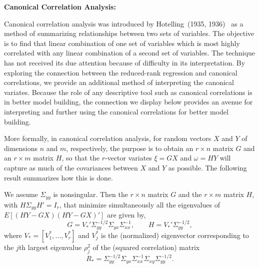 \noindent \textbf{Canonical Correlation Analysis:} \twomedskip


\noindent Canonical correlation analysis was introduced by Hotelling~(1935, 1936)~\cite{hotelling35,hotelling36} as a method of summarizing relationships between two sets of variables. The objective is to find that linear combination of one set of variables which is most highly correlated with any linear combination of a second set of variables. The technique has not received its due attention because of difficulty in its interpretation. By exploring the connection between the reduced-rank regression and canonical correlations, we provide an additional method of interpreting the canonical variates. Because the role of any descriptive tool such as canonical correlations is in better model building, the connection we display below provides an avenue for interpreting and further using the canonical correlations for better model building.


More formally, in canonical correlation analysis, for random vectors $X$ and $Y$ of dimensions $n$ and $m$, respectively, the purpose is to obtain an $r \times n$ matrix $G$ and an $r \times m$ matrix $H$, so that the $r$-vector variates $\xi= GX$ and $\omega= HY$ will capture as much of the covariances between $X$ and $Y$ as possible. The following result summarizes how this is done.


\begin{result} \label{res:4} 
We assume $\Sigma_{yy}$ is nonsingular. Then the $r \times n$ matrix $G$ and the $r \times m$ matrix $H$, with $H \Sigma_{yy}H'= I_r$, that minimize simultaneously all the eigenvalues of $E[(HY-GX)(HY-GX)']$ are given by,
	\begin{equation}
	G= V_*'  \Sigma_{yy}^{-1/2} \Sigma_{yx} \Sigma_{xx}^{-1}, \qquad H= V_*'  \Sigma_{yy}^{-1/2},
	\end{equation}
where $V_*= [V_1^*, \ldots, V_r^*]$ and $V_j^*$ is the (normalized) eigenvector corresponding to the $j$th largest eigenvalue $\rho_j^2$ of the (squared correlation) matrix
	\begin{equation} \label{eqn:eigenlargestmatrix}
	R_*= \Sigma_{yy}^{-1/2} \Sigma_{yx} \Sigma_{xx}^{-1} \Sigma_{xy} \Sigma_{yy}^{-1/2}.
	\end{equation}
\end{result}


